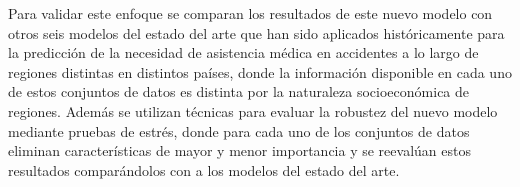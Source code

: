 
Para validar este enfoque se comparan los resultados de este nuevo modelo con otros seis modelos del estado del arte que han sido aplicados históricamente para la predicción de la necesidad de asistencia médica en accidentes a lo largo de regiones distintas en distintos países, donde la información disponible en cada uno de estos conjuntos de datos es distinta por la naturaleza socioeconómica de regiones. Además se utilizan técnicas para evaluar la robustez del nuevo modelo mediante pruebas de estrés, donde para cada uno de los conjuntos de datos eliminan características de mayor y menor importancia y se reevalúan estos resultados comparándolos con a los modelos del estado del arte.


